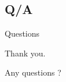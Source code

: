 \subsection{Q/A}

\begin{frame}[fragile]{Questions}
\begin{center}
Thank you.

Any questions ?
\end{center}

\end{frame}
